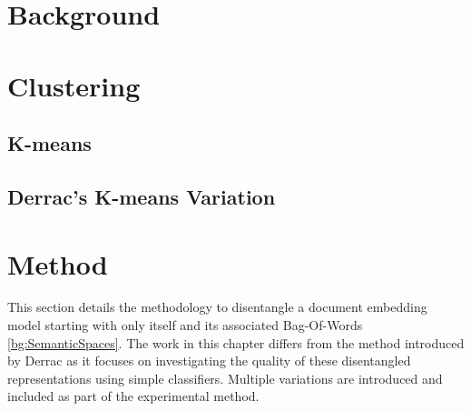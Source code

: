 
\section{Background}\label{ch3:background}

\section{Clustering}\label{bg:clustering}

\subsection{K-means}


\subsection{Derrac's K-means Variation}


\section{Method}\label{ch3:method}

This section details the methodology to disentangle a document embedding model starting with only itself and its associated Bag-Of-Words \ref{bg:SemanticSpaces}.  The work in this chapter differs from the method introduced by Derrac \cite{Derrac2015} as it focuses on investigating the quality of these disentangled representations using simple  classifiers. Multiple variations are introduced and included as part of the experimental method.%

